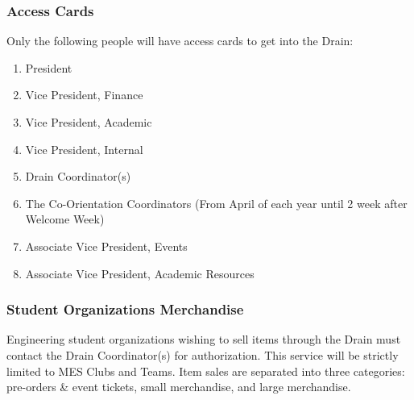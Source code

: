\subsubsection{Access Cards}
\label{access-cards}
Only the following people will have access cards to get into the Drain:

\begin{enumerate}
 \item
  President
 \item
  Vice President, Finance
 \item
  Vice President, Academic
 \item
  Vice President, Internal
 \item
  Drain Coordinator(s)
 \item
  The Co-Orientation Coordinators (From April of each year until 2 week after Welcome Week) %
 \item
  Associate Vice President, Events
 \item
  Associate Vice President, Academic Resources

\end{enumerate}

\subsubsection{Student Organizations Merchandise}
\label{student-organizations-merchandise}
Engineering student organizations wishing to sell items through the
Drain must contact the Drain Coordinator(s) for authorization. This
service will be strictly limited to MES Clubs and Teams. Item sales are
separated into three categories: pre-orders \& event tickets, small
merchandise, and large merchandise.

